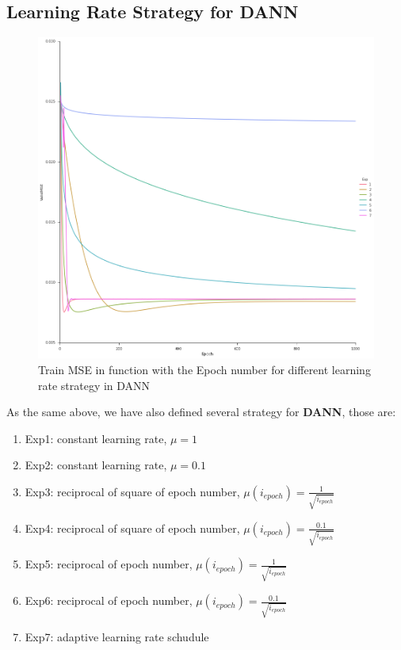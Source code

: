 \subsection{Learning Rate Strategy for DANN}
\begin{figure}[htbp]
	\centering
	\includegraphics[width=15cm]{Figures/4.png}
	\caption[Train MSE in function with the Epoch number for different learning rate strategy in DANN]{Train MSE in function with the Epoch number for different learning rate strategy in DANN}
	\label{fig:4}
\end{figure}
As the same above, we have also defined several strategy for \textbf{DANN}, those are:
\begin{enumerate}
	\item Exp1: constant learning rate, $ \mu = 1 $
	\item Exp2: constant learning rate, $ \mu = 0.1 $
	\item Exp3: reciprocal of square of epoch number, $ \mu(i_{epoch}) = \frac{1}{\sqrt{i_{epoch}}}$
	\item Exp4: reciprocal of square of epoch number, $ \mu(i_{epoch}) = \frac{0.1}{\sqrt{i_{epoch}}}$
	\item Exp5: reciprocal of epoch number, $ \mu(i_{epoch}) = \frac{1}{\sqrt{i_{epoch}}}$\
	\item Exp6: reciprocal of epoch number, $ \mu(i_{epoch}) = \frac{0.1}{\sqrt{i_{epoch}}}$
	\item Exp7: adaptive learning rate schudule
\end{enumerate}

